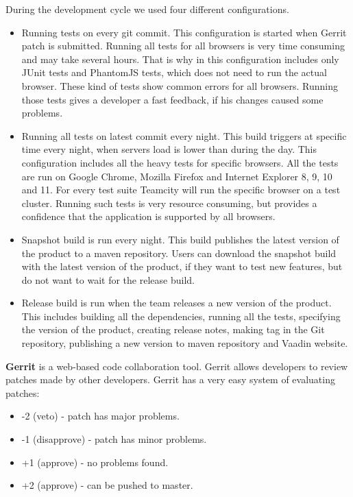   During the development cycle we used four different configurations.
  \begin{itemize}
  \item Running tests on every git commit. This configuration is started when Gerrit patch is submitted.
   Running all tests for all browsers is very time consuming and may take several hours. 
   That is why in this configuration includes only JUnit tests and PhantomJS
   tests, which does not need to run the actual browser. These kind of tests show common errors for all browsers.
   Running those tests gives a developer a fast feedback, if his changes caused some problems.
   \item Running all tests on latest commit every night. This build triggers at
    specific time every night, when servers load is lower than during the day.
    This configuration includes all the heavy tests for specific browsers. All
    the tests are run on Google Chrome, Mozilla Firefox and Internet Explorer 8, 9, 10 and 11. 
    For every test suite Teamcity will run the specific browser on a test
    cluster. Running such tests is very resource consuming, but provides a
    confidence that the application is supported by all browsers.
    \item Snapshot build is run every night. This build publishes the latest
    version of the product to a maven repository.  Users can download
    the snapshot build with the latest version of the product, if they want to
    test new features, but do not want to wait for the release build.
    \item Release build is run when the team releases a new version of the
    product. This includes building all the dependencies, running all the tests,
    specifying the version of the product, creating release notes, making tag in
    the Git repository, publishing a new version to maven repository and Vaadin
    website.
   \end{itemize}

\textbf{Gerrit} is a web-based code collaboration tool. Gerrit allows developers to
  review patches made by other developers. Gerrit has a very easy system of evaluating patches:
  \begin{itemize}
  \item -2 (veto) - patch has major problems.
  \item -1 (disapprove) - patch has minor problems.
  \item +1 (approve) - no problems found.
  \item +2 (approve) - can be pushed to master.
  \end{itemize}
  

